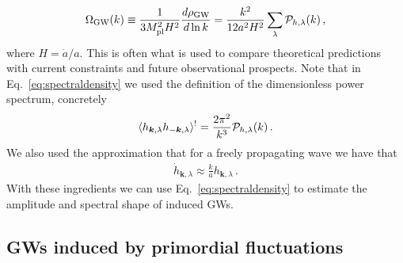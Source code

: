 \documentclass[a4paper,11pt]{article}
\numberwithin{equation}{section}
\begin{document}
\begin{equation}\label{eq:spectraldensity}
\Omega_{\rm GW}(k)\equiv\frac{1}{3 M_{\rm pl}^2 H^2}\frac{d \rho_{\rm GW}}{d\ln k}=\frac{k^2}{12a^2H^2}\sum_\lambda{\cal P}_{h,\lambda}(k)\,,
\end{equation}
where $H=\dot a/a$.
This is often what is used to compare theoretical predictions with current constraints and future observational prospects. Note that in Eq.~\eqref{eq:spectraldensity} we used the definition of the dimensionless power spectrum, concretely
\begin{equation}\label{eq:hh}
\langle h_{\bm{k},\lambda}h_{-\bm{k},\lambda}\rangle^{!}= \frac{2\pi^2}{k^3}{\cal P}_{h,\lambda}(k)\,.
\end{equation}
We also used the approximation that for a freely propagating wave we have that 
\begin{align}
\dot h_{\bm{k},\lambda}\approx\frac{k}{a} h_{\bm{k},\lambda}\,.
\end{align}
With these ingredients we can use Eq.~\eqref{eq:spectraldensity} to estimate the amplitude and spectral shape of induced GWs.


\subsection{GWs induced by primordial fluctuations \label{sec:induced1}}
\end{document}
